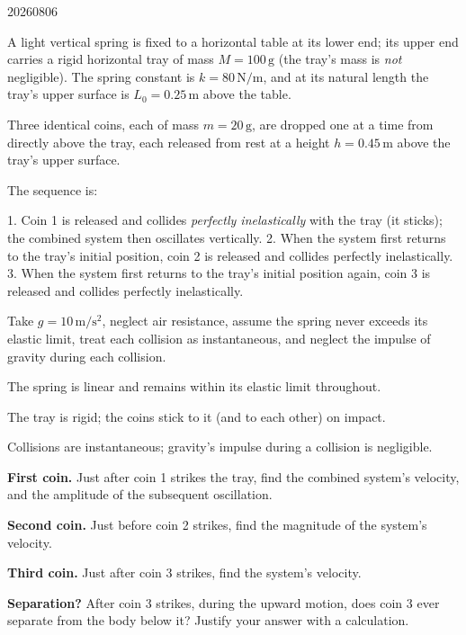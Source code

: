 

\begin{problem}{20260806}

A light vertical spring is fixed to a horizontal table at its lower end; its upper end carries a rigid horizontal tray of mass $M = 100\,\mathrm{g}$ (the tray's mass is \emph{not} negligible).  The spring constant is $k = 80\,\mathrm{N/m}$, and at its natural length the tray's upper surface is $L_{0} = 0.25\,\mathrm{m}$ above the table.

Three identical coins, each of mass $m = 20\,\mathrm{g}$, are dropped one at a time from directly above the tray, each released from rest at a height $h = 0.45\,\mathrm{m}$ above the tray's upper surface.

The sequence is:

1. Coin 1 is released and collides \emph{perfectly inelastically} with the tray (it sticks); the combined system then oscillates vertically.
2. When the system first returns to the tray's initial position, coin 2 is released and collides perfectly inelastically.
3. When the system first returns to the tray's initial position again, coin 3 is released and collides perfectly inelastically.

Take $g = 10\,\mathrm{m/s^{2}}$, neglect air resistance, assume the spring never exceeds its elastic limit, treat each collision as instantaneous, and neglect the impulse of gravity during each collision.

\begin{assumptions}
  \item The spring is linear and remains within its elastic limit throughout.
  \item The tray is rigid; the coins stick to it (and to each other) on impact.
  \item Collisions are instantaneous; gravity's impulse during a collision is negligible.
\end{assumptions}

\begin{questions}
  \item \textbf{First coin.}
        Just after coin 1 strikes the tray, find the combined system's velocity, and the amplitude of the subsequent oscillation.

  \item \textbf{Second coin.}
        Just before coin 2 strikes, find the magnitude of the system's velocity.

  \item \textbf{Third coin.}
        Just after coin 3 strikes, find the system's velocity.

  \item \textbf{Separation?}
        After coin 3 strikes, during the upward motion, does coin 3 ever separate from the body below it?  Justify your answer with a calculation.
\end{questions}

\end{problem}

